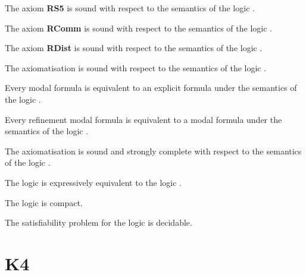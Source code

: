 \begin{lemma}
The axiom {\bf RS5} is sound with respect to the semantics of the logic \logicRmlS{}.
\end{lemma}

\begin{lemma}
The axiom {\bf RComm} is sound with respect to the semantics of the logic \logicRmlS{}.
\end{lemma}

\begin{lemma}
The axiom {\bf RDist} is sound with respect to the semantics of the logic \logicRmlS{}.
\end{lemma}

\begin{lemma}
The axiomatisation \axiomRmlS{} is sound with respect to the semantics of the logic \logicRmlS{}.
\end{lemma}

\begin{lemma}
Every modal formula is equivalent to an explicit formula under the semantics of the logic \logicS{}.
\end{lemma}


\begin{lemma}
Every refinement modal formula is equivalent to a modal formula under the semantics of the logic \logicRmlS{}.
\end{lemma}


\begin{theorem}
The axiomatisation \axiomRmlS{} is sound and strongly complete with respect to the semantics of the logic \logicRmlS{}.
\end{theorem}


\begin{corollary}
The logic \logicRmlS{} is expressively equivalent to the logic \logicS{}.
\end{corollary}

\begin{corollary}
The logic \logicRmlS{} is compact.
\end{corollary}

\begin{corollary}
The satisfiability problem for the logic \logicRmlS{} is decidable.
\end{corollary}

\section{K4}

